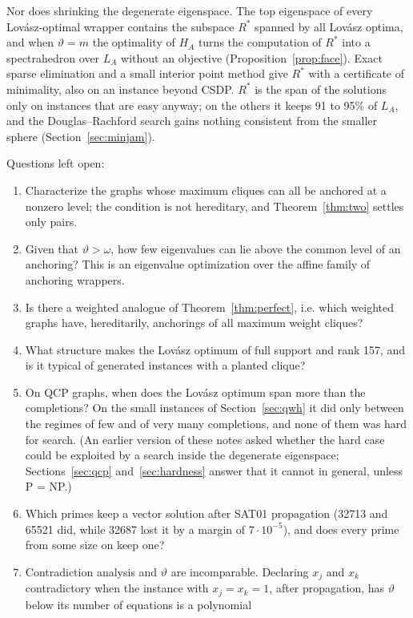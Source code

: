 \documentclass[11pt]{article}
\theoremstyle{definition}
\theoremstyle{remark}
\newcommand{\gr}[1]{\texttt{\detokenize{#1}}}
\begin{document}
Nor does shrinking the degenerate eigenspace. The top eigenspace of every
Lov\'asz-optimal wrapper contains the subspace $R^*$ spanned by all
Lov\'asz optima, and when $\vartheta=m$ the optimality of $H_A$ turns the
computation of $R^*$ into a spectrahedron over $L_A$ without an objective
(Proposition~\ref{prop:face}). Exact sparse elimination and a small interior
point method give $R^*$ with a certificate of minimality, also on an
instance beyond CSDP. $R^*$ is the span of the solutions only on instances
that are easy anyway; on the others it keeps 91 to 95\% of $L_A$, and the
Douglas--Rachford search gains nothing consistent from the smaller sphere
(Section~\ref{sec:minjam}).

Questions left open:
\begin{enumerate}
\item Characterize the graphs whose maximum cliques can all be anchored at a
nonzero level; the condition is not hereditary, and Theorem~\ref{thm:two}
settles only pairs.
\item Given that $\vartheta>\omega$, how few eigenvalues can lie above the
common level of an anchoring? This is an eigenvalue optimization over the
affine family of anchoring wrappers.
\item Is there a weighted analogue of Theorem~\ref{thm:perfect}, i.e. which
weighted graphs have, hereditarily, anchorings of all maximum weight
cliques?
\item What structure makes the Lov\'asz optimum of \gr{gen200_p0.9_44} full
support and rank 157, and is it typical of generated instances with a
planted clique?
\item On QCP graphs, when does the Lov\'asz optimum span more than the
completions? On the small instances of Section~\ref{sec:qwh} it did only
between the regimes of few and of very many completions, and none of them
was hard for search. (An earlier version of these notes asked whether the
hard case could be exploited by a search inside the degenerate eigenspace;
Sections~\ref{sec:qcp} and~\ref{sec:hardness} answer that it cannot in
general, unless P = NP.)
\item Which primes keep a vector solution after SAT01 propagation (32713 and
65521 did, while 32687 lost it by a margin of $7\cdot10^{-5}$), and does every
prime from some size on keep one?
\item Contradiction analysis and $\vartheta$ are incomparable. Declaring $x_j$
and $x_k$ contradictory when the instance with $x_j=x_k=1$, after
propagation, has $\vartheta$ below its number of equations is a polynomial

\end{enumerate}
\end{document}
